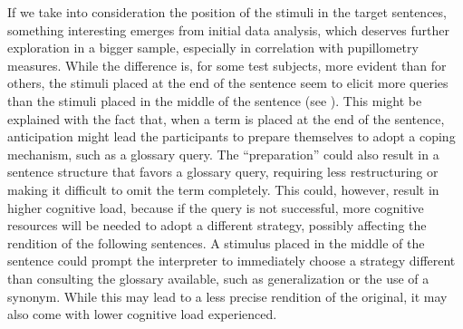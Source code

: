 \documentclass[output=paper]{langsci/langscibook}
\begin{document}
If we take into consideration the position of the stimuli in the target sentences, something interesting emerges from initial data analysis, which deserves further exploration in a bigger sample, especially in correlation with pupillometry measures. While the difference is, for some test subjects, more evident than for others, the stimuli placed at the end of the sentence seem to elicit more queries than the stimuli placed in the middle of the sentence (see ). This might be explained with the fact that, when a term is placed at the end of the sentence, anticipation might lead the participants to prepare themselves to adopt a coping mechanism, such as a glossary query. The ``preparation'' could also result in a sentence structure that favors a glossary query, requiring less restructuring or making it difficult to omit the term completely. This could, however, result in higher cognitive load, because if the query is not successful, more cognitive resources will be needed to adopt a different strategy, possibly affecting the rendition of the following sentences. A stimulus placed in the middle of the sentence could prompt the interpreter to immediately choose a strategy different than consulting the glossary available, such as generalization or the use of a synonym. While this may lead to a less precise rendition of the original, it may also come with lower cognitive load experienced.
\end{document}
